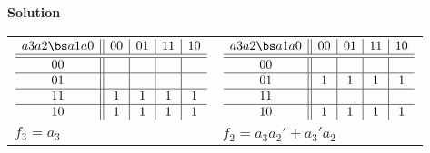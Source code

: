 \begin{enumerate}
\begin{itemize}
                \begin{onlysolution}  \textbf{Solution} \itshape{
                        \begin{tabular}{ll}
                            $
                            \begin{array} {c||c|c|c|c}
                                a3 a2 \bs a1 a0 & 00 & 01 & 11 & 10 \\ \hline \hline
                                00        &    &    &    &    \\ \hline
                                01        &    &    &    &    \\ \hline
                                11        & 1  & 1  & 1  & 1  \\ \hline
                                10        & 1  & 1  & 1  & 1  \\
                            \end{array}$ &
                            $
                            \begin{array} {c||c|c|c|c}
                                a3 a2 \bs a1 a0 & 00 & 01 & 11 & 10 \\ \hline \hline
                                00        &    &    &    &    \\ \hline
                                01        & 1  & 1  & 1  & 1  \\ \hline
                                11        &    &    &    &    \\ \hline
                                10        & 1  & 1  & 1  & 1  \\
                            \end{array} $ \\
                            $f_3 = a_3$ & $f_2 = a_3a_2'+a_3'a_2$\\
                        \end{tabular}
                    }
                \end{onlysolution}


\end{itemize}
\end{enumerate}
